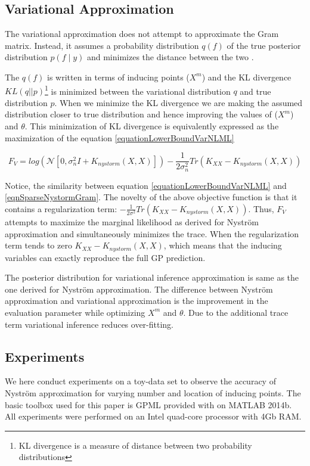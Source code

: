 \subsection{Variational Approximation}\label{subSecVariationalApprox} 
The variational approximation does not attempt to approximate the Gram matrix. Instead, it assumes a probability distribution $q(f)$ of the true posterior distribution $p(f \mid y)$ and minimizes the distance between the two \cite{Titsias09variationallearning}. 

The $q(f)$ is written in terms of inducing points ($X^{m}$) and the KL divergence $KL(q||p)$\footnote{KL divergence is a measure of distance between two probability distributions} is minimized between the variational distribution $q$ and true distribution $p$. When we minimize the KL divergence we are making the assumed distribution closer to true distribution and hence improving the values of ($X^{m}$) and $\theta $. This minimization of KL divergence is equivalently expressed as the maximization of the equation \ref{equationLowerBoundVarNLML}

\begin{equation}\label{equationLowerBoundVarNLML}
F_{V} = log(\mathcal{N}[0, \sigma_{n}^{2}I + K_{nystorm}(X, X)]) - \frac{1}{2\sigma_{n}^{2}}Tr(K_{XX} - K_{nystorm}(X, X))
\end{equation}

Notice, the similarity between equation \ref{equationLowerBoundVarNLML} and \ref{eqnSparseNystormGram}. The novelty of the above objective function is that it contains a regularization term: $- \frac{1}{2\sigma ^{2}}Tr(K_{XX} - K_{nystorm}(X, X))$. Thus, $F_{V}$ attempts to maximize the marginal likelihood as derived for Nystr\"{o}m approximation and simultaneously minimizes the trace. When the regularization term tends to zero $K_{XX} - K_{nystorm}(X, X)$, which means that the inducing variables can exactly reproduce the full GP prediction. 

The posterior distribution for variational inference approximation is same as the one derived for Nystr\"{o}m approximation. The difference between Nystr\"{o}m approximation and variational approximation is the improvement in the evaluation parameter while optimizing $X^{m}$ and $\theta$. Due to the additional trace term variational inference reduces over-fitting.

\subsection{Experiments}\label{subsecNystromExperiments}
We here conduct experiments on a toy-data set to observe the accuracy of Nystr\"{o}m approximation for varying number and location of inducing points. The basic toolbox used for this paper is GPML provided with \cite{rasmussen2006gaussian} on MATLAB 2014b. All experiments were performed on an Intel quad-core processor with 4Gb RAM. 


